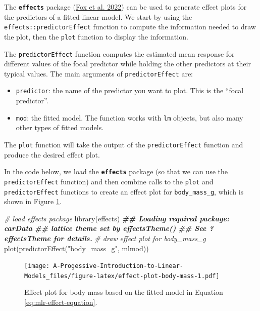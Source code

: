 \documentclass[
]{book}
\newenvironment{Shaded}{\begin{snugshade}}{\end{snugshade}}
\newcommand{\CommentTok}[1]{\textcolor[rgb]{0.56,0.35,0.01}{\textit{#1}}}
\newcommand{\DocumentationTok}[1]{\textcolor[rgb]{0.56,0.35,0.01}{\textbf{\textit{#1}}}}
\newcommand{\FunctionTok}[1]{\textcolor[rgb]{0.00,0.00,0.00}{#1}}
\newcommand{\NormalTok}[1]{#1}
\newcommand{\StringTok}[1]{\textcolor[rgb]{0.31,0.60,0.02}{#1}}
\providecommand{\tightlist}{%
  \setlength{\itemsep}{0pt}\setlength{\parskip}{0pt}}
\theoremstyle{definition}
\theoremstyle{definition}
\theoremstyle{definition}
\theoremstyle{definition}
\theoremstyle{remark}
\begin{document}
The \textbf{\texttt{effects}} package (\protect\hyperlink{ref-R-effects}{Fox et al. 2022}) can be used to generate effect
plots for the predictors of a fitted linear model. We start by using the
\texttt{effects::predictorEffect} function to compute the information needed to
draw the plot, then the \texttt{plot} function to display the information.

The \texttt{predictorEffect} function computes the estimated mean response for
different values of the focal predictor while holding the other
predictors at their typical values. The main arguments of
\texttt{predictorEffect} are:

\begin{itemize}
\tightlist
\item
  \texttt{predictor}: the name of the predictor you want to plot. This is the
  ``focal predictor''.
\item
  \texttt{mod}: the fitted model. The function works with \texttt{lm} objects, but
  also many other types of fitted models.
\end{itemize}

The \texttt{plot} function will take the output of the \texttt{predictorEffect}
function and produce the desired effect plot.

In the code below, we load the \textbf{\texttt{effects}} package (so that we can use
the \texttt{predictorEffect} function) and then combine calls to the \texttt{plot} and
\texttt{predictorEffect} functions to create an effect plot for \texttt{body\_mass\_g},
which is shown in Figure \ref{fig:effect-plot-body-mass}.

\begin{Shaded}
\begin{Highlighting}[]
\CommentTok{\# load effects package}
\FunctionTok{library}\NormalTok{(effects)}
\DocumentationTok{\#\# Loading required package: carData}
\DocumentationTok{\#\# lattice theme set by effectsTheme()}
\DocumentationTok{\#\# See ?effectsTheme for details.}
\CommentTok{\# draw effect plot for body\_mass\_g}
\FunctionTok{plot}\NormalTok{(}\FunctionTok{predictorEffect}\NormalTok{(}\StringTok{"body\_mass\_g"}\NormalTok{, mlmod))}
\end{Highlighting}
\end{Shaded}

\begin{figure}
\centering
\texttt{[image: A-Progessive-Introduction-to-Linear-Models\_files/figure-latex/effect-plot-body-mass-1.pdf]}
\caption{\label{fig:effect-plot-body-mass}Effect plot for body mass based on the fitted model in Equation \eqref{eq:mlr-effect-equation}.}
\end{figure}
\end{document}
